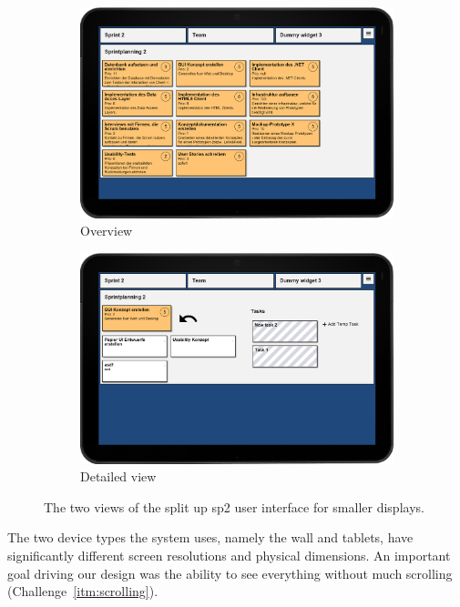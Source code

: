 \documentclass{sigchi}
\begin{document}
\begin{figure}
	\centering
	\begin{subfigure}[b]{1\columnwidth}
		\includegraphics[width=\textwidth]{figures/sp2-overview-framed}
		\caption{Overview}
		\label{fig:sp2-overview}
	\end{subfigure}%
	\quad
	\begin{subfigure}[b]{1\columnwidth}
		\includegraphics[width=\textwidth]{figures/sp2-detail-framed}
		\caption{Detailed view}
		\label{fig:sp2-detail}
	\end{subfigure}
	
	\caption{The two views of the split up \gls{sp2} user interface for smaller displays.}\label{fig:sp2-smallscreen-views}
\end{figure}


The two device types the system uses, namely the wall and tablets, have significantly different screen resolutions and physical dimensions. An important goal driving our design was the ability to see everything without much scrolling (Challenge~\ref{itm:scrolling}).
\end{document}
